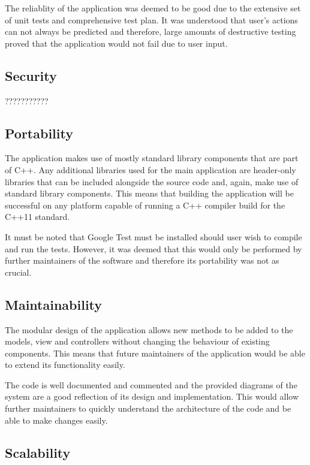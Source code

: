 \documentclass[
  english,
  a4paper,
,tablecaptionabove
]{scrartcl}
\begin{document}
The reliablity of the application was deemed to be good due to the
extensive set of unit tests and comprehensive test plan. It was
understood that user's actions can not always be predicted and
therefore, large amounts of destructive testing proved that the
application would not fail due to user input.

\hypertarget{security}{%
\subsection{Security}\label{security}}

???????????

\hypertarget{portability}{%
\subsection{Portability}\label{portability}}

The application makes use of mostly standard library components that are
part of C++. Any additional libraries used for the main application are
header-only libraries that can be included alongside the source code
and, again, make use of standard library components. This means that
building the application will be successful on any platform capable of
running a C++ compiler build for the C++11 standard.

It must be noted that Google Test must be installed should user wish to
compile and run the tests. However, it was deemed that this would only
be performed by further maintainers of the software and therefore its
portability was not as crucial.

\hypertarget{maintainability}{%
\subsection{Maintainability}\label{maintainability}}

The modular design of the application allows new methods to be added to
the models, view and controllers without changing the behaviour of
existing components. This means that future maintainers of the
application would be able to extend its functionality easily.

The code is well documented and commented and the provided diagrams of
the system are a good reflection of its design and implementation. This
would allow further maintainers to quickly understand the architecture
of the code and be able to make changes easily.

\hypertarget{scalability}{%
\subsection{Scalability}\label{scalability}}
\end{document}
